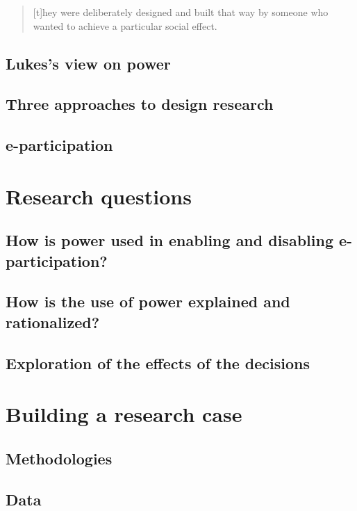\documentclass[12pt,a4paper]{article}
\begin{document}
\begin{quote}
[t]hey were deliberately designed and built that way by someone who wanted to achieve a particular social effect.
\end{quote}

\subsection{Lukes's view on power}

\subsection{Three approaches to design research}

\subsection{e-participation}

\section{Research questions}

\subsection{How is power used in enabling and disabling e-participation?}

\subsection{How is the use of power explained and rationalized?}

\subsection{Exploration of the effects of the decisions}

\section{Building a research case}

\subsection{Methodologies}

\subsection{Data}



\end{document}
